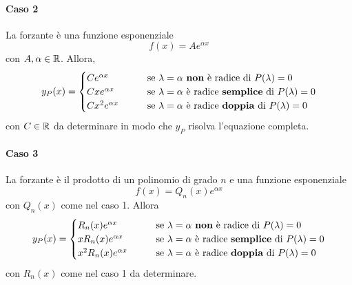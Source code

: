 \paragraph{Caso 2} La forzante è una funzione esponenziale
\begin{equation*}
    f(x)= A e^{\alpha x}
\end{equation*}
con $A, \alpha \in \mathbb{R}$. Allora, 
\begin{equation*}
    y_P(x)= \begin{cases}
        C e^{\alpha x} &\qquad \text{se}\ \lambda=\alpha\ \text{\textbf{non} è radice di}\ P(\lambda)=0\\
        C xe^{\alpha x} &\qquad \text{se}\ \lambda=\alpha\ \text{è radice \textbf{semplice} di}\ P(\lambda)=0\\
        Cx^2 e^{\alpha x} &\qquad \text{se}\ \lambda=\alpha\ \text{è radice \textbf{doppia} di}\ P(\lambda)=0\\
    \end{cases}
\end{equation*}
con $C \in \mathbb{R}$ da determinare in modo che $y_P$ risolva l'equazione completa.
\paragraph{Caso 3} La forzante è il prodotto di un polinomio di grado $n$ e una funzione esponenziale
\begin{equation*}
    f(x)=Q_n(x) e^{\alpha x}
\end{equation*}
con $Q_n(x)$ come nel caso 1. Allora
\begin{equation*}
    y_P(x)= \begin{cases}
        R_n(x) e^{\alpha x} &\qquad \text{se}\ \lambda=\alpha\ \text{\textbf{non} è radice di}\ P(\lambda)=0\\
        x R_n(x)e^{\alpha x} &\qquad \text{se}\ \lambda=\alpha\ \text{è radice \textbf{semplice} di}\ P(\lambda)=0\\
        x^2 R_n(x) e^{\alpha x} &\qquad \text{se}\ \lambda=\alpha\ \text{è radice \textbf{doppia} di}\ P(\lambda)=0\\
    \end{cases}
\end{equation*}
con $R_n(x)$ come nel caso 1 da determinare.
